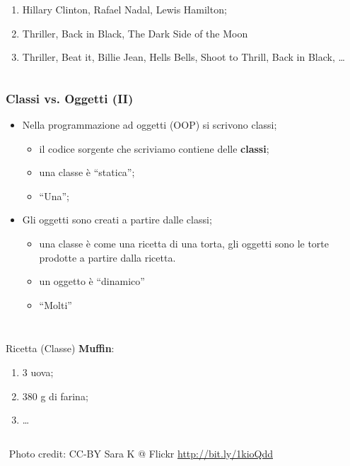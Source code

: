 \begin{frame}[fragile]
\begin{columns}[T]
    \begin{column}[T]{6cm}    
      \begin{enumerate}
       \item Hillary Clinton, Rafael Nadal, Lewis Hamilton;
       \item Thriller, Back in Black, The Dark Side of the Moon
       \item {\small Thriller, Beat it, Billie Jean, Hells Bells, Shoot to Thrill, Back in Black, \dots}
      \end{enumerate}
    \end{column}
  \end{columns}

\end{frame}

\begin{frame}[fragile]\frametitle{Classi vs. Oggetti (II)}

  \begin{itemize}
   \item Nella programmazione ad oggetti (OOP) si scrivono classi;
    \begin{itemize}
      \item il codice sorgente che scriviamo contiene delle \textbf{classi};
      \item una classe è ``statica'';
      \item ``Una'';
    \end{itemize}
   \end{itemize}

   \begin{itemize}
   \item Gli oggetti sono creati a partire dalle classi;
    \begin{itemize}
      \item una classe è come una ricetta di una torta, gli oggetti sono le torte prodotte
      a partire dalla ricetta.
      \item un oggetto è ``dinamico''
      \item ``Molti''
    \end{itemize}
  \end{itemize}

  ${}$
  \begin{columns}[T]
    \begin{column}[T]{4cm}
      Ricetta (Classe) \textbf{Muffin}:
      \begin{enumerate}
       \item 3 uova;
       \item 380 g di farina;
       \item \dots
      \end{enumerate}
    \end{column}

    \begin{column}[T]{7cm}    
    \end{column}
  \end{columns}
  ${}$
  {\scriptsize Photo credit: CC-BY Sara K @ Flickr \url{http://bit.ly/1kioQdd}}
\end{frame}